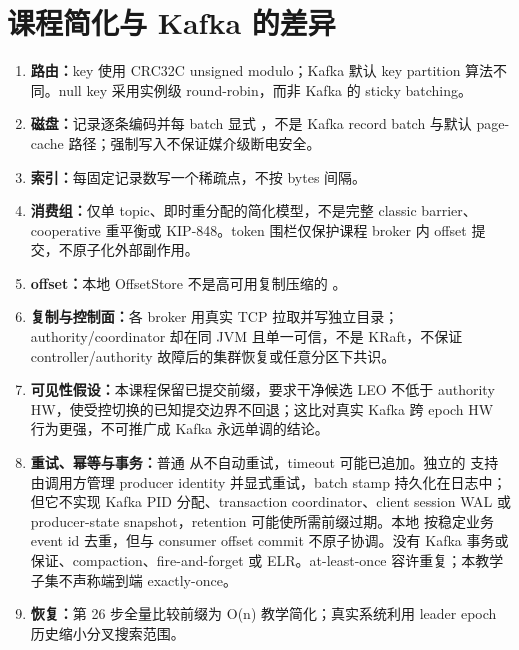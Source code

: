 \section{课程简化与 Kafka 的差异}
\begin{enumerate}
\item \textbf{路由：}key 使用 CRC32C unsigned modulo；Kafka 默认 key partition 算法不同。null key 采用实例级 round-robin，而非 Kafka 的 sticky batching。
\item \textbf{磁盘：}记录逐条编码并每 batch 显式 ，不是 Kafka record batch 与默认 page-cache 路径；强制写入不保证媒介级断电安全。
\item \textbf{索引：}每固定记录数写一个稀疏点，不按 bytes 间隔。
\item \textbf{消费组：}仅单 topic、即时重分配的简化模型，不是完整 classic barrier、cooperative 重平衡或 KIP-848。token 围栏仅保护课程 broker 内 offset 提交，不原子化外部副作用。
\item \textbf{offset：}本地 OffsetStore 不是高可用复制压缩的 。
\item \textbf{复制与控制面：}各 broker 用真实 TCP 拉取并写独立目录；authority/coordinator 却在同 JVM 且单一可信，不是 KRaft，不保证 controller/authority 故障后的集群恢复或任意分区下共识。
\item \textbf{可见性假设：}本课程保留已提交前缀，要求干净候选 LEO 不低于 authority HW，使受控切换的已知提交边界不回退；这比对真实 Kafka 跨 epoch HW 行为更强，不可推广成 Kafka 永远单调的结论。
\item \textbf{重试、幂等与事务：}普通  从不自动重试，timeout 可能已追加。独立的  支持由调用方管理 producer identity 并显式重试，batch stamp 持久化在日志中；但它不实现 Kafka PID 分配、transaction coordinator、client session WAL 或 producer-state snapshot，retention 可能使所需前缀过期。本地  按稳定业务 event id 去重，但与 consumer offset commit 不原子协调。没有 Kafka 事务或  保证、compaction、fire-and-forget 或 ELR。at-least-once 容许重复；本教学子集不声称端到端 exactly-once。
\item \textbf{恢复：}第 26 步全量比较前缀为 O(n) 教学简化；真实系统利用 leader epoch 历史缩小分叉搜索范围。
\end{enumerate}

